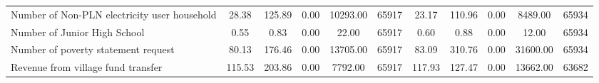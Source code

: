 \begin{tabular}{l*{2}{ccccc}}
Number of Non-PLN electricity user household&    28.38&   125.89&     0.00& 10293.00&    65917&    23.17&   110.96&     0.00&  8489.00&    65934\\
Number of Junior High School&     0.55&     0.83&     0.00&    22.00&    65917&     0.60&     0.88&     0.00&    12.00&    65934\\
Number of poverty statement request&    80.13&   176.46&     0.00& 13705.00&    65917&    83.09&   310.76&     0.00& 31600.00&    65934\\
Revenue from village fund transfer&   115.53&   203.86&     0.00&  7792.00&    65917&   117.93&   127.47&     0.00& 13662.00&    63682\\
\bottomrule
\end{tabular}
